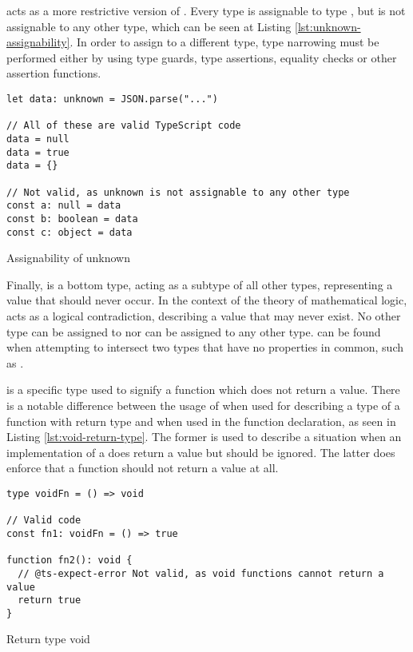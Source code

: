  acts as a more restrictive version of . Every type is assignable to type , but  is not assignable to any other type, which can be seen at Listing \ref{lst:unknown-assignability}. In order to assign  to a different type, type narrowing must be performed either by using type guards, type assertions, equality checks or other assertion functions.

\clearpage

\begin{listing}[ht]
  \begin{verbatim}
let data: unknown = JSON.parse("...") 

// All of these are valid TypeScript code
data = null
data = true
data = {}

// Not valid, as unknown is not assignable to any other type
const a: null = data
const b: boolean = data
const c: object = data
  \end{verbatim}
  \caption{Assignability of unknown}\label{lst:unknown-assignability}
\end{listing}

Finally,  is a bottom type, acting as a subtype of all other types, representing a value that should never occur. In the context of the theory of mathematical logic,  acts as a logical contradiction, describing a value that may never exist. No other type can be assigned to  nor  can be assigned to any other type.  can be found when attempting to intersect two types that have no properties in common, such as .

 is a specific type used to signify a function which does not return a value. There is a notable difference between the usage of  when used for describing a type of a function with  return type and when used in the function declaration, as seen in Listing \ref{lst:void-return-type}. The former is used to describe a situation when an implementation of a  does return a value but should be ignored. The latter does enforce that a function should not return a value at all.

\begin{listing}[ht]
  \begin{verbatim}
type voidFn = () => void

// Valid code
const fn1: voidFn = () => true

function fn2(): void {
  // @ts-expect-error Not valid, as void functions cannot return a value
  return true
}
\end{verbatim}
  \caption{Return type void}\label{lst:void-return-type}
\end{listing}

